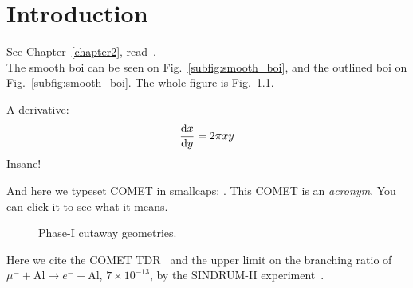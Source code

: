 \chapter{Introduction}

See Chapter~\ref{chapter2}, read~\cite{goodfellow_generative_2014}.\\
The smooth boi can be seen on Fig.~\ref{subfig:smooth_boi}, and the outlined boi on Fig.~\ref{subfig:smooth_boi}. The whole figure is Fig.~\ref{fig:my_label}.

A derivative:
$$\frac{\textrm{d}{x}}{\textrm{d}{y}} = 2\pi x y$$
Insane!

And here we typeset COMET in smallcaps: \COMET. This \acrshort{COMET} is an \emph{acronym}. You can click it to see what it means.

\begin{figure}
    \centering
    \caption{Phase-I cutaway geometries.}
    \label{fig:my_label}
\end{figure}

Here we cite the COMET TDR~\cite{the_comet_collaboration_comet_2020} and the upper limit on the branching ratio of $\mu^- + \textrm{Al} \rightarrow e^- + \textrm{Al}$, $7\times 10^{-13}$, by the SINDRUM-II experiment~\cite{Bertl:2006up}.
